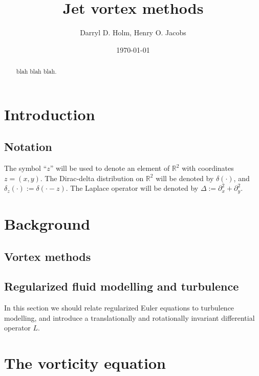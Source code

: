 \documentclass[12pt]{amsart}
\title{Jet vortex methods}
\author{Darryl D. Holm, Henry O. Jacobs}
\date{\today}
\begin{document}
\maketitle

\begin{abstract}
  blah blah blah.
\end{abstract}

\section{Introduction}
\label{sec:intro}


\subsection{Notation}
The symbol ``$z$'' will be used to denote
an element of $\mathbb{R}^2$
with coordinates $z = (x,y)$.
The Dirac-delta distribution on $\mathbb{R}^2$
will be denoted by $\delta(\cdot)$, and $\delta_z(\cdot) := \delta( \cdot - z)$.
The Laplace operator will be denoted by $\Delta := \partial_x^2 + \partial_y^2$.

\section{Background}

\subsection{Vortex methods}

\subsection{Regularized fluid modelling and turbulence}
\label{sec:turbulence}

In this section we should relate regularized Euler equations 
to turbulence modelling, and introduce a translationally and rotationally invariant differential operator $L$.

\section{The vorticity equation}
\label{sec:vorticity}

\end{document}
